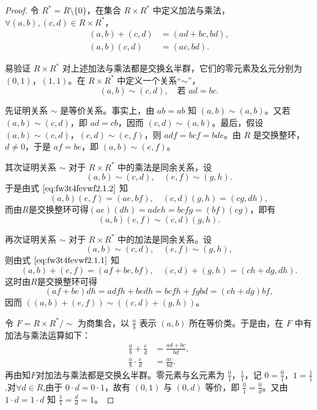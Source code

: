 \documentclass[../../main.tex]{subfiles}%
\begin{document}
\begin{proof}

令 \( R^* = R \setminus \{0\} \)，在集合 \( R \times R^* \) 中定义加法与乘法，\( \forall (a, b), (c, d) \in R \times R^* \)，
\begin{align}
(a, b) + (c, d) &= (ad + bc, bd), \label{eq:fw3t4fevwf2.1.1} \\
(a, b)(c, d) &= (ac, bd). \label{eq:fw3t4fevwf2.1.2}
\end{align}

易验证 \( R \times R^* \) 对上述加法与乘法都是交换幺半群，它们的零元素及幺元分别为 \( (0, 1) \)，\( (1, 1) \)。在 \( R \times R^* \) 中定义一个关系“\( \sim \)”，
\[
(a, b) \sim (c, d), \quad \text{若 } ad = bc.
\]

先证明关系 \( \sim \) 是等价关系。事实上，由 \( ab = ab \) 知 \( (a, b) \sim (a, b) \)。又若 \( (a, b) \sim (c, d) \)，即 \( ad = cb \)，因而 \( (c, d) \sim (a, b) \)。最后，假设 \( (a, b) \sim (c, d) \)，\( (c, d) \sim (e, f) \)，则 \( adf = bcf = bde \)。由 \( R \) 是交换整环，\( d \neq 0 \)，于是 \( af = be \)，即 \( (a, b) \sim (e, f) \)。

其次证明关系 \( \sim \) 对于 \( R \times R^* \) 中的乘法是同余关系，设
\[
(a, b) \sim (c, d), \quad (e, f) \sim (g, h).
\]
于是由式 \(\eqref{eq:fw3t4fevwf2.1.2}\) 知
\[
(a, b)(e, f) = (ae, bf), \quad (c, d)(g, h) = (cg, dh),
\]
而由\( R \)是交换整环可得\( (ae)(dh) = adeh = bcfg = (bf)(cg) \)，即有
\[
(a, b)(e, f) \sim (c, d)(g, h).
\]

再次证明关系 \( \sim \) 对于 \( R \times R^* \) 中的加法是同余关系。设
\[
(a, b) \sim (c, d), \quad (e, f) \sim (g, h),
\]
则由式 \(\eqref{eq:fw3t4fevwf2.1.1}\) 知
\[
(a, b) + (e, f) = (af + be, bf), \quad (c, d) + (g, h) = (ch + dg, dh).
\]
这时由\( R \)是交换整环可得
\[
(af + be)dh = adfh + bedh = bcfh + fgbd = (ch + dg)bf,
\]
因而 \( ((a, b) + (e, f)) \sim ((c, d) + (g, h)) \)。

令 \( F = R \times R^*/\sim \) 为商集合，以 \( \frac{a}{b} \) 表示 \( (a, b) \) 所在等价类。于是由，在 \( F \) 中有加法与乘法运算如下：
\begin{align*}
\frac{a}{b} + \frac{c}{d} &= \frac{ad + bc}{bd}, \\
\frac{a}{b} \cdot \frac{c}{d} &= \frac{ac}{bd}.
\end{align*}
再由知$F$对加法与乘法都是交换幺半群。零元素与幺元素为 \( \frac{0}{1} \)，\( \frac{1}{1} \)，记 \( 0 = \frac{0}{1} \)，\( 1 = \frac{1}{1} \).对$\forall d\in R$,由于 \( 0 \cdot d = 0 \cdot 1 \)，故有 \( (0, 1) \) 与 \( (0, d) \) 等价，即 \( \frac{0}{1} = \frac{0}{d} \)。又由 \( 1 \cdot d = 1 \cdot d \) 知 \( \frac{1}{1} = \frac{d}{d} = 1 \)。


\end{proof}
\end{document}
